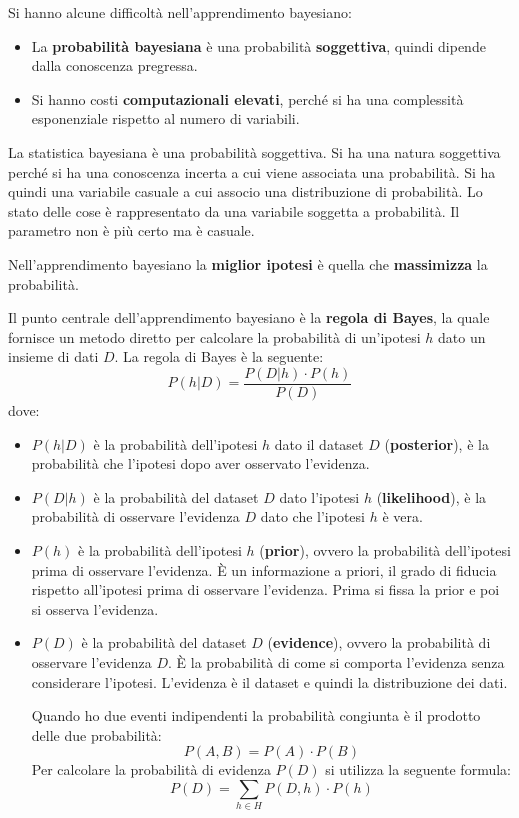 Si hanno alcune difficoltà nell'apprendimento bayesiano:
\begin{itemize}
    \item La \textbf{probabilità bayesiana} è una probabilità \textbf{soggettiva},
          quindi dipende dalla conoscenza pregressa.
    \item Si hanno costi \textbf{computazionali elevati}, perché si ha una
          complessità esponenziale rispetto al numero di variabili.
\end{itemize}
La statistica bayesiana è una probabilità soggettiva. Si ha una natura soggettiva
perché si ha una conoscenza incerta a cui viene associata una probabilità. Si
ha quindi una variabile casuale a cui associo una distribuzione di probabilità.
Lo stato delle cose è rappresentato da una variabile soggetta a probabilità.
Il parametro non è più certo ma è casuale.
\begin{nota}
    Nell'apprendimento bayesiano la \textbf{miglior ipotesi} è quella che
    \textbf{massimizza} la probabilità.
\end{nota}
Il punto centrale dell'apprendimento bayesiano è la \textbf{regola di Bayes},
la quale fornisce un metodo diretto per calcolare la probabilità di un'ipotesi
$h$ dato un insieme di dati $D$. La regola di Bayes è la seguente:
\begin{equation}
    P(h|D) = \frac{P(D|h) \cdot P(h)}{P(D)}
\end{equation}
dove:
\begin{itemize}
    \item $P(h|D)$ è la probabilità dell'ipotesi $h$ dato il dataset $D$
          (\textbf{posterior}), è la probabilità che l'ipotesi dopo aver osservato
          l'evidenza.
    \item $P(D|h)$ è la probabilità del dataset $D$ dato l'ipotesi $h$
          (\textbf{likelihood}), è la probabilità di osservare l'evidenza $D$
          dato che l'ipotesi $h$ è vera.
    \item $P(h)$ è la probabilità dell'ipotesi $h$ (\textbf{prior}), ovvero la
          probabilità dell'ipotesi prima di osservare l'evidenza. È un informazione
          a priori, il grado di fiducia rispetto all'ipotesi prima di osservare
          l'evidenza. Prima si fissa la prior e poi si osserva l'evidenza.
    \item $P(D)$ è la probabilità del dataset $D$ (\textbf{evidence}), ovvero
          la probabilità di osservare l'evidenza $D$. È la probabilità di come
          si comporta l'evidenza senza considerare l'ipotesi. L'evidenza è il
          dataset e quindi la distribuzione dei dati.

          Quando ho due eventi indipendenti la probabilità congiunta è il prodotto
          delle due probabilità:
          \begin{equation}
              P(A, B) = P(A) \cdot P(B)
          \end{equation}
          Per calcolare la probabilità di evidenza $P(D)$ si utilizza la seguente
          formula:
          \begin{equation}
              P(D) = \sum_{h \in H} P(D, h) \cdot P(h)
          \end{equation}
\end{itemize}
